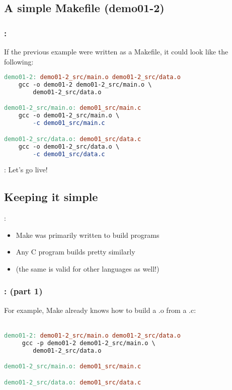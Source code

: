 \subsection{A simple Makefile (demo01-2)}
\begin{frame}[fragile]
    \frametitle{\secname: \small\subsecname\normalsize}

    If the previous example were written as a Makefile, it could look like the following:

    \begin{lstlisting}[language=make]
demo01-2: demo01-2_src/main.o demo01-2_src/data.o
    gcc -o demo01-2 demo01-2_src/main.o \
        demo01-2_src/data.o

demo01-2_src/main.o: demo01_src/main.c
    gcc -o demo01-2_src/main.o \
        -c demo01_src/main.c

demo01-2_src/data.o: demo01_src/data.c
    gcc -o demo01-2_src/data.o \
        -c demo01_src/data.c
    \end{lstlisting}
\end{frame}

\begin{frame}{\secname: \small\subsecname\normalsize}
    Let's go live!

\end{frame}

\subsection{Keeping it simple}
\begin{frame}{\secname: \small\subsecname\normalsize}
    \begin{itemize}
        \item Make was primarily written to build programs
        \item Any C program builds pretty similarly
        \item (the same is valid for other languages as well!)
    \end{itemize}
\end{frame}

\begin{frame}[fragile]
    \frametitle{\secname: \small\subsecname (part 1)\normalsize}

    For example, Make already knows how to build a .o from a .c: \\~\\

    \begin{lstlisting}[language=make]
demo01-2: demo01-2_src/main.o demo01-2_src/data.o
     gcc -p demo01-2 demo01-2_src/main.o \
        demo01-2_src/data.o

demo01-2_src/main.o: demo01_src/main.c

demo01-2_src/data.o: demo01_src/data.c
    \end{lstlisting}
\end{frame}

